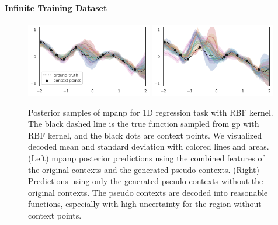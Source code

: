 \paragraph{Infinite Training Dataset}
\label{main:subsec:infinite_training}
\begin{figure}[t]
    \centering
    \includegraphics[width = 0.49\textwidth]{figure/main_vis_1.pdf}
    \includegraphics[width = 0.49\textwidth]{figure/main_vis_2.pdf}
    \caption{Posterior samples of \gls{mpanp} for 1D regression task with RBF kernel. The black dashed line is the true function sampled from \gls{gp} with RBF kernel, and the black dots are context points. We visualized decoded mean and standard deviation with colored lines and areas. (Left) \Gls{mpanp} posterior predictions using the combined features of the original contexts and the generated pseudo contexts. (Right) Predictions using only the generated pseudo contexts without the original contexts. The pseudo contexts are decoded into reasonable functions, especially with high uncertainty for the region without context points.}
    \label{fig:feature_method}
\end{figure}

